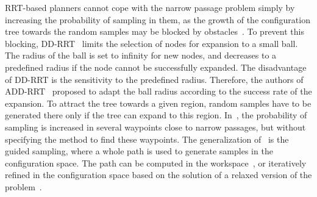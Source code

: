 \documentclass[usletter, 10pt, conference]{ieeeconf} %
\def\C{\mathcal{C}}
\begin{document}

RRT-based planners cannot cope with the narrow passage problem simply by increasing the probability of sampling in them, as the
growth of the configuration tree towards the random samples may be blocked by obstacles~\cite{vonasekphd}.
To prevent this blocking, DD-RRT~\cite{yershovaDDRRT} limits the selection of nodes for expansion to a small ball. 
The radius of the ball is set to infinity for new nodes, and decreases to a predefined radius if the node cannot be successfully expanded.
The disadvantage of DD-RRT is the sensitivity to the predefined radius.
Therefore, the authors of ADD-RRT~\cite{jailletADRRT} proposed to adapt the ball radius according to the success rate of the expansion.
To attract the tree towards a given region, random samples have to be generated there only if the tree can expand to this region.
In~\cite{kardossRRTKK}, the probability of sampling is increased in several waypoints close to narrow passages, but without specifying
the method to find these waypoints.
The generalization of~\cite{kardossRRTKK} is the guided sampling, where a whole path is used
to generate samples in the configuration space.
The path can be computed in the workspace~\cite{vonasek2009rrt}, or iteratively refined in the configuration space based on the solution of a relaxed version of the problem~\cite{bayazitIRC}.
\end{document}
